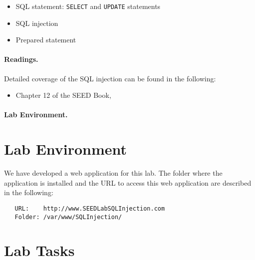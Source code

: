 \begin{itemize}[noitemsep]
\item SQL statement: \texttt{SELECT} and \texttt{UPDATE} statements
\item SQL injection
\item Prepared statement
\end{itemize}



\paragraph{Readings.}
Detailed coverage of the SQL injection can be found in the following:

\begin{itemize}
\item Chapter 12 of the SEED Book, \seedbook
\end{itemize}

\paragraph{Lab Environment.} \seedenvironment




\section{Lab Environment}


We have developed a web application for this lab. The folder where the 
application is installed and the URL to access this web application are 
described in the following: 

\begin{lstlisting}
   URL:    http://www.SEEDLabSQLInjection.com
   Folder: /var/www/SQLInjection/
\end{lstlisting}
 


\newcommand{\urlorurls}{URL }
\newcommand{\urlisorurlsare}{URL is }





\section{Lab Tasks}

